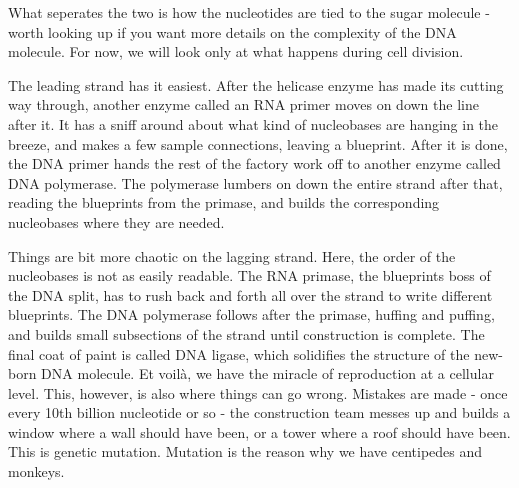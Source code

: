 What seperates the two is how the nucleotides are tied to the sugar molecule - worth looking up if you want more details on the complexity of the DNA molecule.\cite{lewontin}
For now, we will look only at what happens during cell division.

The leading strand has it easiest.
After the helicase enzyme has made its cutting way through, another enzyme called an RNA primer moves on down the line after it.
It has a sniff around about what kind of nucleobases are hanging in the breeze, and makes a few sample connections, leaving a blueprint.
After it is done, the DNA primer hands the rest of the factory work off to another enzyme called DNA polymerase.
The polymerase lumbers on down the entire strand after that, reading the blueprints from the primase, and builds the corresponding nucleobases where they are needed. 

Things are bit more chaotic on the lagging strand.
Here, the order of the nucleobases is not as easily readable.
The RNA primase, the blueprints boss of the DNA split, has to rush back and forth all over the strand to write different blueprints.
The DNA polymerase follows after the primase, huffing and puffing, and builds small subsections of the strand until construction is complete.
The final coat of paint is called DNA ligase, which solidifies the structure of the new-born DNA molecule.
Et voilà, we have the miracle of reproduction at a cellular level.\cite{hankgreen}
This, however, is also where things can go wrong.
Mistakes are made - once every 10th billion nucleotide or so - the construction team messes up and builds a window where a wall should have been, or a tower where a roof should have been.
This is genetic mutation.
Mutation is the reason why we have centipedes and monkeys.